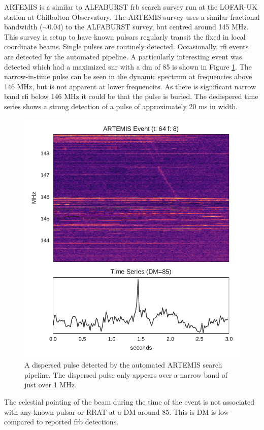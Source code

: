 \documentclass[a4paper,fleqn,usenatbib]{mnras}
\begin{document}
ARTEMIS \citep{2015MNRAS.452.1254K} is a similar to ALFABURST \gls{frb} search
survey run at the LOFAR-UK station at Chilbolton Observatory. The ARTEMIS survey
uses a similar fractional bandwidth ($\sim 0.04$) to the ALFABURST survey, but
centred around 145 MHz. This survey is setup to have known pulsars regularly
transit the fixed in local coordinate beams. Single pulses are routinely
detected. Occasionally, \gls{rfi} events are detected by the automated pipeline. 
A particularly interesting event was detected which had a maximized \gls{snr}
with a \gls{dm} of 85 is shown in Figure \ref{fig:lofar_dynamic}. The
narrow-in-time pulse can be seen in the dynamic spectrum at frequencies above
146 MHz, but is not apparent at lower frequencies. As there is significant
narrow band \gls{rfi} below 146 MHz it could be that the pulse is buried. The
dedispered time series shows a strong detection of a pulse of approximately 20
ms in width.
%
\begin{figure}
    \includegraphics[width=1.0\linewidth]{figures/LOFAR_dynamic.pdf}
    \caption{A dispersed pulse detected by the automated ARTEMIS search
    pipeline. The dispersed pulse only appears over a narrow band of just over 1
    MHz.
    }
    \label{fig:lofar_dynamic}
\end{figure}
%
The celestial pointing of the beam during the time of the event is not
associated with any known pulsar or RRAT at a DM around 85. This is DM is low
compared to reported \gls{frb} detections.
\end{document}
